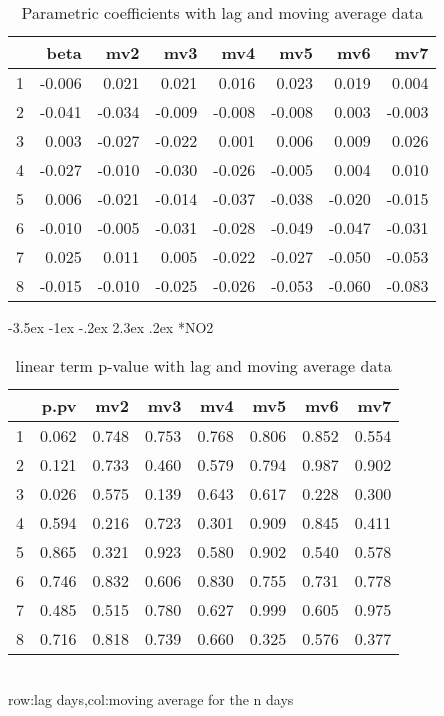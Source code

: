 \documentclass[a4paper, 12pt]{article}
\makeatletter
\def\large{\fontsize{14}{20}\selectfont}
\renewcommand\subsection{\@startsection {subsection}{1}{\z@}%
                                   {-3.5ex \@plus -1ex \@minus -.2ex}%
                                   {2.3ex \@plus.2ex}%
                                   {\centering\normalfont\large\bfseries}}
\makeatother
\begin{document}
\begin{table}[h]
\centering
\caption{Parametric coefficients with lag and moving average data}
\begin{tabular}{rrrrrrrr}
  \hline
 & beta & mv2 & mv3 & mv4 & mv5 & mv6 & mv7 \\
  \hline
1 & -0.006 & 0.021 & 0.021 & 0.016 & 0.023 & 0.019 & 0.004 \\
  2 & -0.041 & -0.034 & -0.009 & -0.008 & -0.008 & 0.003 & -0.003 \\
  3 & 0.003 & -0.027 & -0.022 & 0.001 & 0.006 & 0.009 & 0.026 \\
  4 & -0.027 & -0.010 & -0.030 & -0.026 & -0.005 & 0.004 & 0.010 \\
  5 & 0.006 & -0.021 & -0.014 & -0.037 & -0.038 & -0.020 & -0.015 \\
  6 & -0.010 & -0.005 & -0.031 & -0.028 & -0.049 & -0.047 & -0.031 \\
  7 & 0.025 & 0.011 & 0.005 & -0.022 & -0.027 & -0.050 & -0.053 \\
  8 & -0.015 & -0.010 & -0.025 & -0.026 & -0.053 & -0.060 & -0.083 \\
   \hline
\end{tabular}
\end{table}
\clearpage
\subsection*{NO2}
\begin{table}[h]
\centering
\caption{linear term p-value with lag and moving average data}
\begin{tabular}{rrrrrrrr}
  \hline
 & p.pv & mv2 & mv3 & mv4 & mv5 & mv6 & mv7 \\
  \hline
1 & 0.062 & 0.748 & 0.753 & 0.768 & 0.806 & 0.852 & 0.554 \\
  2 & 0.121 & 0.733 & 0.460 & 0.579 & 0.794 & 0.987 & 0.902 \\
  3 & 0.026 & 0.575 & 0.139 & 0.643 & 0.617 & 0.228 & 0.300 \\
  4 & 0.594 & 0.216 & 0.723 & 0.301 & 0.909 & 0.845 & 0.411 \\
  5 & 0.865 & 0.321 & 0.923 & 0.580 & 0.902 & 0.540 & 0.578 \\
  6 & 0.746 & 0.832 & 0.606 & 0.830 & 0.755 & 0.731 & 0.778 \\
  7 & 0.485 & 0.515 & 0.780 & 0.627 & 0.999 & 0.605 & 0.975 \\
  8 & 0.716 & 0.818 & 0.739 & 0.660 & 0.325 & 0.576 & 0.377 \\
   \hline
\end{tabular}
\\row:lag days,col:moving average for the n days
\end{table}
\end{document}

